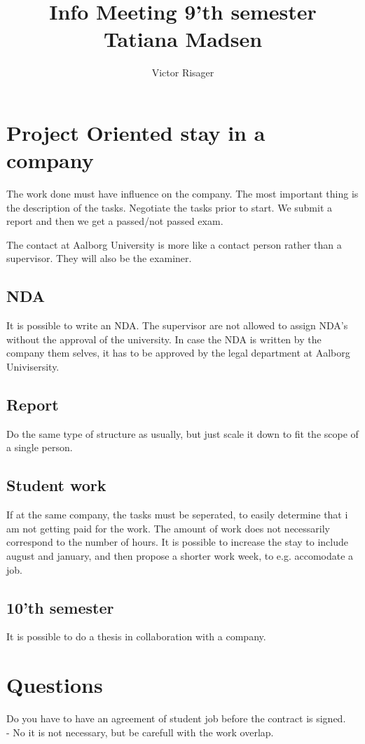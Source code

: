 \documentclass[a4paper]{article}
\title{Info Meeting 9'th semester  \\
	\large Tatiana Madsen}
\author{Victor Risager}
\begin{document}
\maketitle
\section{Project Oriented stay in a company}
The work done must have influence on the company. The most important thing is the description of the tasks. Negotiate the tasks prior to start. We submit a report and then we get a passed/not passed exam. 

The contact at Aalborg University is more like a contact person rather than a supervisor. They will also be the examiner. 
\subsection{NDA}
It is possible to write an NDA. The supervisor are not allowed to assign NDA's without the approval of the university. In case the NDA is written by the company them selves, it has to be approved by the legal department at Aalborg Univisersity. 

\subsection{Report}
Do the same type of structure as usually, but just scale it down to fit the scope of a single person.

\subsection{Student work}
If at the same company, the tasks must be seperated, to easily determine that i am not getting paid for the work. The amount of work does not necessarily correspond to the number of hours. It is possible to increase the stay to include august and january, and then propose a shorter work week, to e.g. accomodate a job. 

\subsection{10'th semester}
It is possible to do a thesis in collaboration with a company. 


\section{Questions}
Do you have to have an agreement of student job before the contract is signed. \\
- No it is not necessary, but be carefull with the work overlap.
\end{document}
